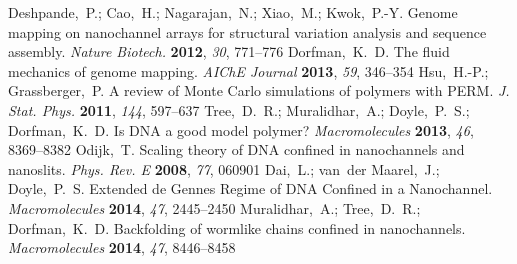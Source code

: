 \documentclass[journal=mamobx,manuscript=article,layout=twocolumn]{achemso}
\begin{document}
\begin{mcitethebibliography}{52}
  Deshpande,~P.; Cao,~H.; Nagarajan,~N.; Xiao,~M.; Kwok,~P.-Y. Genome mapping
  on nanochannel arrays for structural variation analysis and sequence
  assembly. \emph{Nature Biotech.} \textbf{2012}, \emph{30}, 771--776\relax
\mciteBstWouldAddEndPuncttrue
\mciteSetBstMidEndSepPunct{\mcitedefaultmidpunct}
{\mcitedefaultendpunct}{\mcitedefaultseppunct}\relax
\EndOfBibitem
{}
Dorfman,~K.~D. The fluid mechanics of genome mapping. \emph{AIChE Journal}
  \textbf{2013}, \emph{59}, 346--354\relax
\mciteBstWouldAddEndPuncttrue
\mciteSetBstMidEndSepPunct{\mcitedefaultmidpunct}
{\mcitedefaultendpunct}{\mcitedefaultseppunct}\relax
\EndOfBibitem
{}
Hsu,~H.-P.; Grassberger,~P. A review of Monte Carlo simulations of polymers
  with PERM. \emph{J. Stat. Phys.} \textbf{2011}, \emph{144}, 597--637\relax
\mciteBstWouldAddEndPuncttrue
\mciteSetBstMidEndSepPunct{\mcitedefaultmidpunct}
{\mcitedefaultendpunct}{\mcitedefaultseppunct}\relax
\EndOfBibitem
{}
Tree,~D.~R.; Muralidhar,~A.; Doyle,~P.~S.; Dorfman,~K.~D. Is DNA a good model
  polymer? \emph{Macromolecules} \textbf{2013}, \emph{46}, 8369--8382\relax
\mciteBstWouldAddEndPuncttrue
\mciteSetBstMidEndSepPunct{\mcitedefaultmidpunct}
{\mcitedefaultendpunct}{\mcitedefaultseppunct}\relax
\EndOfBibitem
{}
Odijk,~T. Scaling theory of DNA confined in nanochannels and nanoslits.
  \emph{Phys. Rev. E} \textbf{2008}, \emph{77}, 060901\relax
\mciteBstWouldAddEndPuncttrue
\mciteSetBstMidEndSepPunct{\mcitedefaultmidpunct}
{\mcitedefaultendpunct}{\mcitedefaultseppunct}\relax
\EndOfBibitem
{}
Dai,~L.; van~der Maarel,~J.; Doyle,~P.~S. Extended de Gennes Regime of DNA
  Confined in a Nanochannel. \emph{Macromolecules} \textbf{2014}, \emph{47},
  2445--2450\relax
\mciteBstWouldAddEndPuncttrue
\mciteSetBstMidEndSepPunct{\mcitedefaultmidpunct}
{\mcitedefaultendpunct}{\mcitedefaultseppunct}\relax
\EndOfBibitem
{}
Muralidhar,~A.; Tree,~D.~R.; Dorfman,~K.~D. Backfolding of wormlike chains
  confined in nanochannels. \emph{Macromolecules} \textbf{2014}, \emph{47},
  8446--8458\relax
\mciteBstWouldAddEndPuncttrue
\mciteSetBstMidEndSepPunct{\mcitedefaultmidpunct}
{\mcitedefaultendpunct}{\mcitedefaultseppunct}\relax
\EndOfBibitem
{}

\end{mcitethebibliography}
\end{document}
